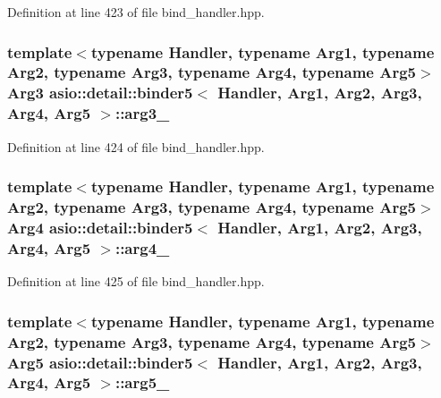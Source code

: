 Definition at line 423 of file bind\+\_\+handler.\+hpp.

\hypertarget{classasio_1_1detail_1_1binder5_a801f94834f9fc7a264e0df6adda829d5}{}
\subsubsection[{arg3\+\_\+}]{\setlength{\rightskip}{0pt plus 5cm}template$<$typename Handler, typename Arg1, typename Arg2, typename Arg3, typename Arg4, typename Arg5$>$ Arg3 {\bf asio\+::detail\+::binder5}$<$ Handler, Arg1, Arg2, Arg3, Arg4, Arg5 $>$\+::arg3\+\_\+}\label{classasio_1_1detail_1_1binder5_a801f94834f9fc7a264e0df6adda829d5}


Definition at line 424 of file bind\+\_\+handler.\+hpp.

\hypertarget{classasio_1_1detail_1_1binder5_aae101215d4ab2e438ae9b8c05e4146a9}{}
\subsubsection[{arg4\+\_\+}]{\setlength{\rightskip}{0pt plus 5cm}template$<$typename Handler, typename Arg1, typename Arg2, typename Arg3, typename Arg4, typename Arg5$>$ Arg4 {\bf asio\+::detail\+::binder5}$<$ Handler, Arg1, Arg2, Arg3, Arg4, Arg5 $>$\+::arg4\+\_\+}\label{classasio_1_1detail_1_1binder5_aae101215d4ab2e438ae9b8c05e4146a9}


Definition at line 425 of file bind\+\_\+handler.\+hpp.

\hypertarget{classasio_1_1detail_1_1binder5_a474dc3cb26a028ffd5fd6477592c64aa}{}
\subsubsection[{arg5\+\_\+}]{\setlength{\rightskip}{0pt plus 5cm}template$<$typename Handler, typename Arg1, typename Arg2, typename Arg3, typename Arg4, typename Arg5$>$ Arg5 {\bf asio\+::detail\+::binder5}$<$ Handler, Arg1, Arg2, Arg3, Arg4, Arg5 $>$\+::arg5\+\_\+}\label{classasio_1_1detail_1_1binder5_a474dc3cb26a028ffd5fd6477592c64aa}


